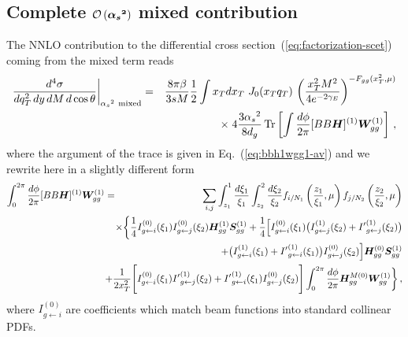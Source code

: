 \documentclass[a4paper,11pt]{report}
\numberwithin{equation}{section}
\newcommand{\bfS}{\bm{S}}
\newcommand{\bfH}{\bm{H}}
\begin{document}
\subsection{Complete $\mathbold{\order{\as^2}}$ mixed contribution }

The NNLO contribution to the differential cross
section~(\ref{eq:factorization-scet}) coming from the mixed term reads
%
\begin{eqnarray}
  \frac{d^4\sigma}{dq_T^2 \, dy \, dM \, d\cos\theta} 
  \bigg |_{\as^2\ \text{mixed}}
  & = &
  \frac{8\pi\beta}{3s M} \frac{1}{2} \int x_Tdx_T \, \, J_0(x_Tq_T) \, \left( \frac{x_T^2M^2}{4e^{-2\gamma_E}} \right)^{-F_{gg}(x_T^2,\mu)}
  \nonumber
  \\
  & & 
  \hspace{40pt} \times \; 4 \frac{3\as^2}{8d_g}\,
  \tr\left[\int \frac{d\phi}{2\pi} [BB\bfH]^{(1)}\bm{W}^{(1)}_{gg} \right]\,,
\end{eqnarray}
%
where the argument of the trace is given in Eq.~(\ref{eq:bbh1wgg1-av}) and we
rewrite here in a slightly different form
%
\begin{eqnarray}
  \int_0^{2\pi} \frac{d\phi}{2\pi}[BB\bfH]^{(1)}\bm{W}^{(1)}_{gg}  & = & 
  \sum_{i,j} \int_{z_1}^{1} \frac{d \xi_1}{\xi_1} 
  \int_{z_2}^{2} \frac{d \xi_2}{\xi_2}
  f_{i/N_1}\left(\frac{z_1}{\xi_1}, \mu\right) 
  f_{j/N_2}\left(\frac{z_2}{\xi_2}, \mu\right)
  \nonumber \\
  & &
  \hspace{-40pt}
  \times \bigg\{
  \frac{1}{4} I_{g\gets i}^{(0)}(\xi_1) I_{g\gets j}^{(0)} (\xi_2)
  \bm{H}^{(1)}_{gg} \bfS_{gg}^{(1)} 
  + \frac{1}{4}
  \Big[
  I_{g\gets i}^{(0)}(\xi_1) \big(I_{g\gets j}^{(1)}(\xi_2) +  
  {I'}_{g\gets j}^{(1)}(\xi_2)\big)
  \nonumber \\
  & &
  + \big(I_{g\gets i}^{(1)}(\xi_1) + 
  {I'}_{g\gets i}^{(1)}(\xi_1) \big) I_{g\gets j}^{(0)}(\xi_2)
  \Big] 
  \bm{H}^{(0)}_{gg}
  \bm{S}^{(1)}_{gg}
  \nonumber 
  \\
  & & 
  \hspace{-20pt}
  + \frac{1}{2 x_T^2}
  \Bigg[
  I_{g\gets i}^{(0)}(\xi_1) {I'}_{g\gets j}^{(1)}(\xi_2)
  +
  {I'}_{g\gets i}^{(1)}(\xi_1) I_{g\gets j}^{(0)}(\xi_2)
  \Bigg]
  \int_0^{2\pi} \frac{d\phi}{2\pi}
  \bm{H}^{M(0)}_{gg}\bm{W}^{(1)}_{gg}
  \bigg\}\,,
  \nonumber \\
  \label{eq:bbh1wgg1-av-rep}
\end{eqnarray}
%
where $I_{g\gets {i}}^{(0)}$ are coefficients which match beam functions into
standard collinear PDFs.
\end{document}

